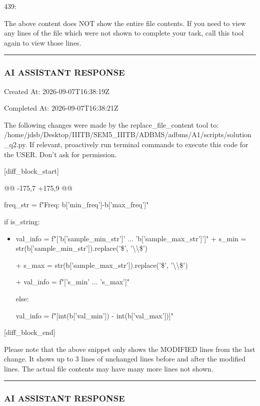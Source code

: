 \documentclass[11pt,a4paper]{article}
\begin{document}
439:

The above content does NOT show the entire file contents. If you need to view any lines of the file which were not shown to complete your task, call this tool again to view those lines.


\hrule

\subsubsection{AI ASSISTANT RESPONSE}

Created At: 2026-09-07T16:38:19Z

Completed At: 2026-09-07T16:38:21Z

The following changes were made by the replace\_file\_content tool to: /home/jdsb/Desktop/IIITB/SEM5\_IIITB/ADBMS/adbms/A1/scripts/solution\_q2.py. If relevant, proactively run terminal commands to execute this code for the USER. Don't ask for permission.

[diff\_block\_start]

@@ -175,7 +175,9 @@

freq\_str = f"Freq: {b['min\_freq']}-{b['max\_freq']}"


if is\_string:

\begin{itemize}
\item            val\_info = f"['{b['sample\_min\_str']}' ... '{b['sample\_max\_str']}']"
+            s\_min = str(b['sample\_min\_str']).replace('\$', '\textbackslash{}\textbackslash{}\$')

+            s\_max = str(b['sample\_max\_str']).replace('\$', '\textbackslash{}\textbackslash{}\$')

+            val\_info = f"['{s\_min}' ... '{s\_max}']"

else:

val\_info = f"[{int(b['val\_min'])} - {int(b['val\_max'])}]"

\end{itemize}

[diff\_block\_end]


Please note that the above snippet only shows the MODIFIED lines from the last change. It shows up to 3 lines of unchanged lines before and after the modified lines. The actual file contents may have many more lines not shown.


\hrule

\subsubsection{AI ASSISTANT RESPONSE}
\end{document}
